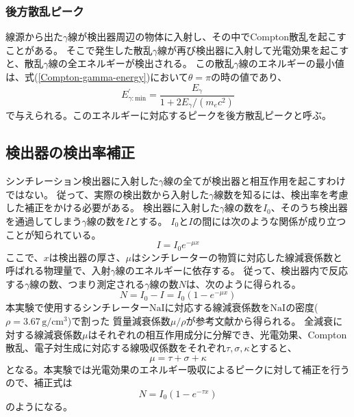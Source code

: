 \documentclass[11pt, titlepage, openany]{ltjsbook}
\begin{document}
\subsubsection{後方散乱ピーク}
線源から出た$\gamma$線が検出器周辺の物体に入射し、その中でCompton散乱を起こすことがある。
そこで発生した散乱$\gamma$線が再び検出器に入射して光電効果を起こすと、散乱$\gamma$線の全エネルギーが検出される。
この散乱$\gamma$線のエネルギーの最小値は、式(\ref{Compton-gamma-energy})において$\theta=\pi$の時の値であり、
\begin{equation}
    E^{\prime}_{\gamma:\mathrm{min}} = \frac{E_{\gamma}}{1 + 2E_{\gamma} / (m_e c^2)}
    \label{kouhou-sanran-formula}
\end{equation}
で与えられる。このエネルギーに対応するピークを後方散乱ピークと呼ぶ。
\subsection{検出器の検出率補正}
シンチレーション検出器に入射した$\gamma$線の全てが検出器と相互作用を起こすわけではない。
従って、実際の検出数から入射した$\gamma$線数を知るには、検出率を考慮した補正をかける必要がある。
検出器に入射した$\gamma$線の数を$I_0$、そのうち検出器を通過してしまう$\gamma$線の数を$I$とする。
$I_0$と$I$の間には次のような関係が成り立つことが知られている。
\begin{equation}
    I = I_0 e^{-\mu x}
\end{equation}
ここで、$x$は検出器の厚さ、$\mu$はシンチレーターの物質に対応した線減衰係数と呼ばれる物理量で、入射$\gamma$線のエネルギーに依存する。
従って、検出器内で反応する$\gamma$線の数、つまり測定される$\gamma$線の数$N$は、次のように得られる。
\begin{equation}
    N = I_0 - I = I_0 (1 - e^{-\mu x})
    \label{N-hosei-mu}
\end{equation}
本実験で使用するシンチレーター$\mathrm{NaI}$に対応する線減衰係数を$\mathrm{NaI}$の密度($\rho = 3.67\,\mathrm{g/cm^3}$)で割った
質量減衰係数$\mu/\rho$が参考文献\cite{kyoukasho}から得られる。
全減衰に対する線減衰係数$\mu$はそれぞれの相互作用成分に分解でき、光電効果、Compton散乱、電子対生成に対応する線吸収係数をそれぞれ$\tau,\sigma,\kappa$とすると、
\begin{equation}
    \mu = \tau + \sigma + \kappa
\end{equation}
となる。本実験では光電効果のエネルギー吸収によるピークに対して補正を行うので、補正式は
\begin{equation}
    N = I_0 (1 - e^{-\tau x})
    \label{N-hosei-tau}
\end{equation}
のようになる。
\end{document}
